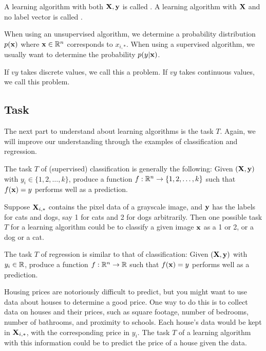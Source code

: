 \begin{definition}
A learning algorithm with both $\MX, \vy$ is called . A learning algorithm with  $\MX$ and no label vector is called . 
\end{definition}
When using an unsupervised algorithm, we determine a probability distribution $p(\vx)$ where $\vx \in \mathbb{R}^n$ corresponds to $x_{i,\ast}$. When using a supervised algorithm, we usually want to determine the probability $p(y|\vx)$. 

\begin{definition}
If $vy$ takes discrete values, we call this a  problem. If $vy$ takes continuous values, we call this  problem. 
\end{definition}


\subsection{Task}

The next part to understand about learning algorithms is the task $T$. Again, we will improve our understanding through the examples of classification and regression.

The task $T$ of (supervised) classification is generally the following: Given $(\MX, \vy)$ with $y_i \in \{ 1, 2, \ldots, k \}$, produce a function $f: \R^n \to \{ 1, 2, \ldots, k \}$ such that $f(\vx) = y$ performs well as a prediction.

\begin{example}
Suppose $\MX_{i,\ast}$ contains the pixel data of a grayscale image, and $\vy$ has the labels for cats and dogs, say 1 for cats and 2 for dogs arbitrarily. Then one possible task $T$ for a learning algorithm could be to classify a given image $\vx$ as a 1 or 2, or a dog or a cat.
\end{example}

The task $T$ of regression is similar to that of classification: Given $(\MX, \vy)$ with $y_i \in \R$, produce a function $f: \R^n \to \R$ such that $f(\vx) = y$ performs well as a prediction.

\begin{example}
Housing prices are notoriously difficult to predict, but you might want to use data about houses to determine a good price. One way to do this is to collect data on houses and their prices, such as square footage, number of bedrooms, number of bathrooms, and proximity to schools. Each house's data would be kept in $\MX_{i,\ast}$, with the corresponding price in $y_i$. The task $T$ of a learning algorithm with this information could be to predict the price of a house given the data.
\end{example}

